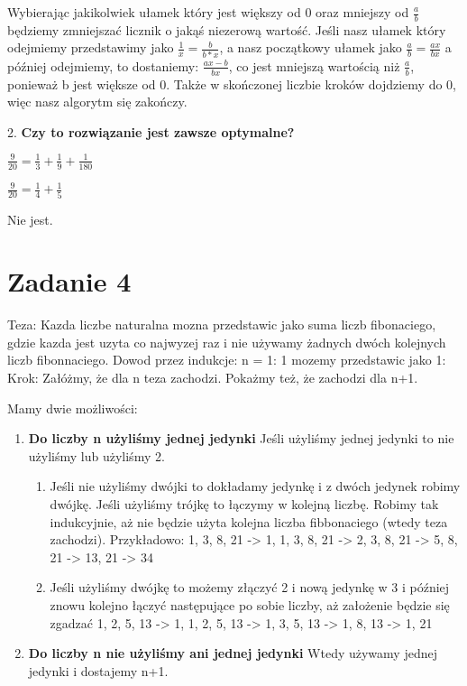 \documentclass[12pt]{article}
\begin{document}
Wybierając jakikolwiek ułamek który jest większy od 0 oraz mniejszy od $\frac{a}{b}$ będziemy zmniejszać licznik o jakąś niezerową wartość. Jeśli nasz ułamek który odejmiemy przedstawimy jako $\frac{1}{x} = \frac{b}{b*x}$, a nasz początkowy ułamek jako $\frac{a}{b} = \frac{ax}{bx}$ a później odejmiemy, to dostaniemy:
$\frac{ax-b}{bx}$, co jest mniejszą wartością niż $\frac{a}{b}$, ponieważ b jest większe od 0. Także w skończonej liczbie kroków dojdziemy do 0, więc nasz algorytm się zakończy.

2. \textbf{Czy to rozwiązanie jest zawsze optymalne?}

$\frac{9}{20} = \frac{1}{3} + \frac{1}{9} + \frac{1}{180}$

$\frac{9}{20} = \frac{1}{4} + \frac{1}{5}$

Nie jest.

\section{Zadanie 4}
Teza: Kazda liczbe naturalna mozna przedstawic jako suma liczb fibonaciego, gdzie kazda jest uzyta co najwyzej raz i nie używamy żadnych dwóch kolejnych liczb fibonnaciego.
Dowod przez indukcje:
n = 1:
1 mozemy przedstawic jako 1:
Krok:
Załóżmy, że dla n teza zachodzi.
Pokażmy też, że zachodzi dla n+1.

Mamy dwie możliwości:
\begin{enumerate}
    \item \textbf{Do liczby n użyliśmy jednej jedynki}
    Jeśli użyliśmy jednej jedynki to nie użyliśmy lub użyliśmy 2.
    \begin{enumerate}
        \item Jeśli nie użyliśmy dwójki to dokładamy jedynkę i z dwóch jedynek robimy dwójkę. Jeśli użyliśmy trójkę to łączymy w kolejną liczbę. Robimy tak indukcyjnie, aż nie będzie użyta kolejna liczba fibbonaciego (wtedy teza zachodzi).
        Przykładowo:
        1, 3, 8, 21 -> 1, 1, 3, 8, 21 -> 2, 3, 8, 21 -> 5, 8, 21 -> 13, 21 -> 34 
        \item Jeśli użyliśmy dwójkę to możemy złączyć 2 i nową jedynkę w 3 i później znowu kolejno łączyć następujące po sobie liczby, aż założenie będzie się zgadzać
        1, 2, 5, 13 -> 1, 1, 2, 5, 13 -> 1, 3, 5, 13 -> 1, 8, 13 -> 1, 21 
    \end{enumerate}
    \item \textbf{Do liczby n nie użyliśmy ani jednej jedynki}
    Wtedy używamy jednej jedynki i dostajemy n+1.
\end{enumerate}
\end{document}
